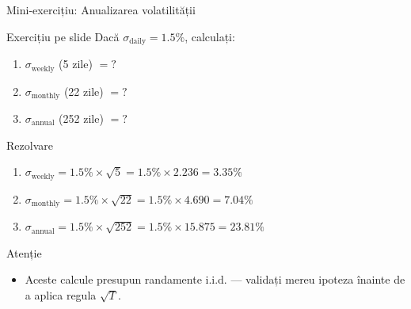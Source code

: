 \documentclass[9pt, aspectratio=169, t]{beamer}
\theoremstyle{definition}
\begin{document}
\begin{frame}{Mini-exercițiu: Anualizarea volatilității}
\begin{exampleblock}{Exercițiu pe slide}
Dacă $\sigma_{\text{daily}} = 1.5\%$, calculați:
\begin{enumerate}\setlength{\itemsep}{0pt}
    \item $\sigma_{\text{weekly}}$ (5 zile) $= ?$
    \item $\sigma_{\text{monthly}}$ (22 zile) $= ?$
    \item $\sigma_{\text{annual}}$ (252 zile) $= ?$
\end{enumerate}
\end{exampleblock}
\vspace{0.1cm}
\begin{block}{Rezolvare}
\begin{enumerate}\setlength{\itemsep}{0pt}
    \item $\sigma_{\text{weekly}} = 1.5\% \times \sqrt{5} = 1.5\% \times 2.236 = \mathbf{3.35\%}$
    \item $\sigma_{\text{monthly}} = 1.5\% \times \sqrt{22} = 1.5\% \times 4.690 = \mathbf{7.04\%}$
    \item $\sigma_{\text{annual}} = 1.5\% \times \sqrt{252} = 1.5\% \times 15.875 = \mathbf{23.81\%}$
\end{enumerate}
\end{block}
\vspace{0.05cm}
\begin{alertblock}{Atenție}
\begin{itemize}\setlength{\itemsep}{0pt}
\item Aceste calcule presupun randamente i.i.d. --- validați mereu ipoteza înainte de a aplica regula $\sqrt{T}$.
\end{itemize}
\end{alertblock}
\end{frame}
\end{document}
